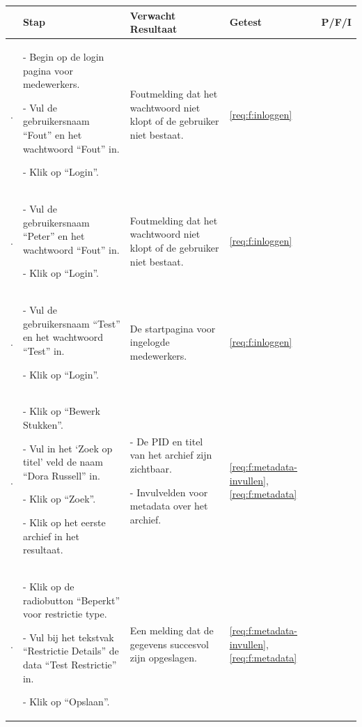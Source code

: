 \documentclass[a4paper,titlepage]{report}
\begin{document}
    \setcounter{step}{1}
    \makeatletter
      \def\c{\arabic{step}.\addtocounter{step}{1}}
    \makeatother
    \begin{longtable}{| m{} | m{}
      | m{} | m{} | m{} |}
      \hline
      & \textbf{Stap} & \textbf{Verwacht Resultaat} & \textbf{Getest}
      & \textbf{P/F/I} \\\hline
      \endhead

      \c &
      \par - Begin op de login pagina voor medewerkers.
      \par - Vul de gebruikersnaam ``Fout'' en het wachtwoord ``Fout'' in.
      \par - Klik op ``Login''.
      & Foutmelding dat het wachtwoord niet klopt of de gebruiker niet
      bestaat.
      & \ref{req:f:inloggen}
      & \\\hline

      \c &
      \par - Vul de gebruikersnaam ``Peter'' en het wachtwoord ``Fout'' in.
      \par - Klik op ``Login''.
      & Foutmelding dat het wachtwoord niet klopt of de gebruiker niet
      bestaat.
      & \ref{req:f:inloggen}
      & \\\hline

      \c &
      \par - Vul de gebruikersnaam ``Test'' en het wachtwoord ``Test'' in.
      \par - Klik op ``Login''.
      & De startpagina voor ingelogde medewerkers.
      & \ref{req:f:inloggen}
      & \\\hline
      \hline


      \c &
      \par - Klik op ``Bewerk Stukken''.
      \par - Vul in het `Zoek op titel' veld de naam ``Dora Russell'' in.
      \par - Klik op ``Zoek''.
      \par - Klik op het eerste archief in het resultaat.
      & \par - De PID en titel van het archief zijn zichtbaar.
        \par - Invulvelden voor metadata over het archief.
      & \ref{req:f:metadata-invullen}, \ref{req:f:metadata}
      & \\\hline

      \c &
      \par - Klik op de radiobutton ``Beperkt'' voor restrictie type.
      \par - Vul bij het tekstvak ``Restrictie Details'' de data ``Test Restrictie''
        in.
      \par - Klik op ``Opslaan''.
      & Een melding dat de gegevens succesvol zijn opgeslagen.
      & \ref{req:f:metadata-invullen}, \ref{req:f:metadata}
      & \\\hline


\end{longtable}
\end{document}
